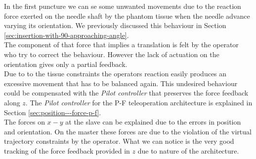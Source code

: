In the first puncture we can se some unwanted movements due to the reaction force exerted on the needle shaft by the phantom tissue when the needle advance varying its orientation.
We previously discussed this behaviour in Section \ref{sec:insertion-with-90-approaching-angle}.\\
The component of that force that implies a translation is felt by the operator who try to correct the behaviour. However the lack of actuation on the orientation gives only a partial feedback.\\
Due to to the tissue constraints the operators reaction easily produces an excessive movement that has to be balanced again. This undesired behaviour could be compensated with the \textit{Pilot controller} that preserves the force feedback along $z$. The \textit{Pilot controller} for the P-F teleoperation architecture is explained in Section \ref{sec:position---force-p-f}.\\
The forces on $x-y$ at the slave can be explained due to the errors in position and orientation. On the master these forces are due to the violation of the virtual trajectory constraints by the operator.
What we can notice is the very good tracking of the force feedback provided in $z$ due to nature of the architecture.
